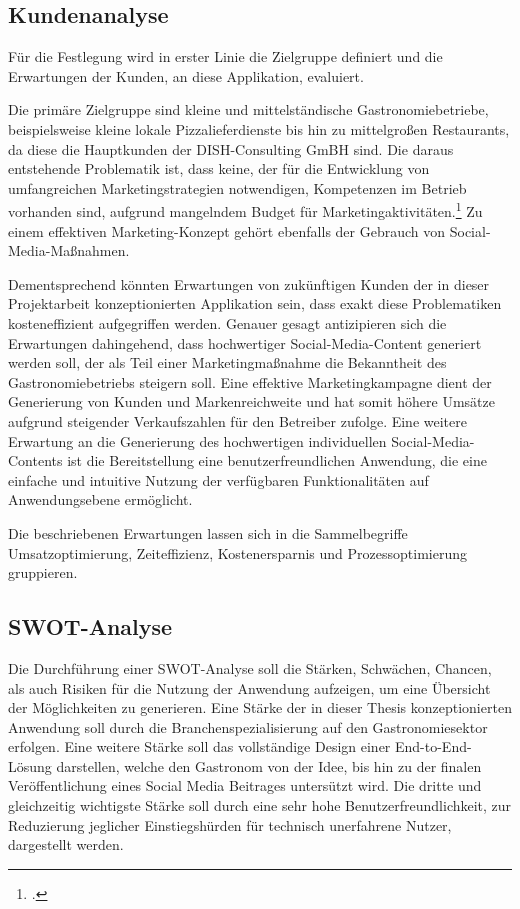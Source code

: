 \subsection{Kundenanalyse}
Für die Festlegung wird in erster Linie die Zielgruppe definiert und die Erwartungen der Kunden, an diese Applikation, evaluiert.

Die primäre Zielgruppe sind kleine und mittelständische Gastronomiebetriebe, beispielsweise kleine lokale Pizzalieferdienste bis hin zu mittelgroßen Restaurants, da diese die Hauptkunden der DISH-Consulting GmBH sind.
Die daraus entstehende Problematik ist, dass keine, der für die Entwicklung von umfangreichen Marketingstrategien notwendigen, Kompetenzen im Betrieb vorhanden sind, aufgrund mangelndem Budget für Marketingaktivitäten.\footcite{restroworks2024}
Zu einem effektiven Marketing-Konzept gehört ebenfalls der Gebrauch von Social-Media-Maßnahmen.

Dementsprechend könnten Erwartungen von zukünftigen Kunden der in dieser Projektarbeit konzeptionierten Applikation sein, dass exakt diese Problematiken kosteneffizient aufgegriffen werden.
Genauer gesagt antizipieren sich die Erwartungen dahingehend, dass hochwertiger Social-Media-Content generiert werden soll, der als Teil einer Marketingmaßnahme die Bekanntheit des Gastronomiebetriebs steigern soll.
Eine effektive Marketingkampagne dient der Generierung von Kunden und Markenreichweite und hat somit höhere Umsätze aufgrund steigender Verkaufszahlen für den Betreiber zufolge.
Eine weitere Erwartung an die Generierung des hochwertigen individuellen Social-Media-Contents ist die Bereitstellung eine benutzerfreundlichen Anwendung, die eine einfache und intuitive Nutzung der verfügbaren Funktionalitäten auf Anwendungsebene ermöglicht.

Die beschriebenen Erwartungen lassen sich in die Sammelbegriffe Umsatzoptimierung, Zeiteffizienz, Kostenersparnis und Prozessoptimierung gruppieren.

\subsection{SWOT-Analyse}
Die Durchführung einer SWOT-Analyse soll die Stärken, Schwächen, Chancen, als auch Risiken für die Nutzung der Anwendung aufzeigen, um eine Übersicht der Möglichkeiten zu generieren.
Eine Stärke der in dieser Thesis konzeptionierten Anwendung soll durch die Branchenspezialisierung auf den Gastronomiesektor erfolgen.
Eine weitere Stärke soll das vollständige Design einer End-to-End-Lösung darstellen, welche den Gastronom von der Idee, bis hin zu der finalen Veröffentlichung eines Social Media Beitrages untersützt wird.
Die dritte und gleichzeitig wichtigste Stärke soll durch eine sehr hohe Benutzerfreundlichkeit, zur Reduzierung jeglicher Einstiegshürden für technisch unerfahrene Nutzer, dargestellt werden.

